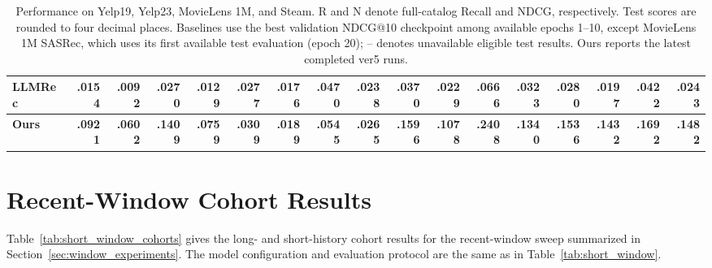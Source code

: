 ﻿\documentclass[sigconf,anonymous,review]{acmart}
\begin{document}
\begin{table}[!tbp]
{\begin{tabular}{l*{4}{rrrr}}
        LLMRec & .0154 & .0092 & .0270 & .0129 & .0277 & .0176 & .0470 & .0238 & .0370 & .0229 & .0666 & .0323 & .0280 & .0197 & .0422 & .0243 \\
        \midrule
        \textbf{Ours} & \textbf{.0921} & \textbf{.0602} & \textbf{.1409} & \textbf{.0759} & \textbf{.0309} & \textbf{.0189} & \textbf{.0545} & \textbf{.0265} & \textbf{.1596} & \textbf{.1078} & \textbf{.2408} & \textbf{.1340} & \textbf{.1536} & \textbf{.1432} & \textbf{.1692} & \textbf{.1482} \\
        \bottomrule
    \end{tabular}%
    }
    \caption{Performance on Yelp19, Yelp23, MovieLens 1M, and Steam. R and N denote full-catalog Recall and NDCG, respectively. Test scores are rounded to four decimal places. Baselines use the best validation NDCG@10 checkpoint among available epochs 1--10, except MovieLens 1M SASRec, which uses its first available test evaluation (epoch 20); -- denotes unavailable eligible test results. Ours reports the latest completed ver5 runs.}
    \label{tab:additional_datasets}
    \vspace{-0.3cm}
\end{table}

\section{Recent-Window Cohort Results}
\label{app:short_window_cohorts}

Table~\ref{tab:short_window_cohorts} gives the long- and short-history cohort results for the recent-window sweep summarized in Section~\ref{sec:window_experiments}. The model configuration and evaluation protocol are the same as in Table~\ref{tab:short_window}.
\end{document}
